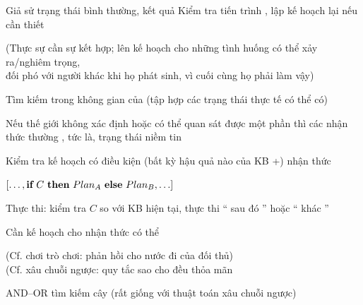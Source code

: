 \documentclass{article}
\newcommand{\condstep}[3]{\mbf{if}~#1~\mbf{then}~#2~\mbf{else}~#3}
\begin{document}
\begin{huge}
\nl
    Giả sử trạng thái bình thường, kết quả\nl
    Kiểm tra tiến trình , lập kế hoạch lại nếu cần thiết\\

(Thực sự cần sự kết hợp; lên kế hoạch cho những tình huống có thể xảy ra/nghiêm trọng,\\
đối phó với người khác khi họ phát sinh, vì cuối cùng họ phải làm vậy)


       

Tìm kiếm trong không gian của  (tập hợp các trạng thái thực tế có thể có)

\textwidth
{}


Nếu thế giới không xác định hoặc có thể quan sát được một phần\al
  thì các nhận thức thường , \al
  tức là,  trạng thái niềm tin

\vspace*{0.2in}

\textwidth
{}


Kiểm tra kế hoạch có điều kiện (bất kỳ hậu quả nào của KB +) nhận thức

$[\ldots,\condstep{C}{Plan_A}{Plan_B},\ldots]$

Thực thi: kiểm tra $C$ so với KB hiện tại, thực thi `` sau đó '' hoặc `` khác ''

Cần  kế hoạch cho  nhận thức có thể

(Cf. chơi trò chơi:  phản hồi cho  nước đi của đối thủ)\\
(Cf. xâu chuỗi ngược:  quy tắc sao cho  đều thỏa mãn

AND--OR tìm kiếm cây (rất giống với thuật toán xâu chuỗi ngược)




\end{huge}
\end{document}
